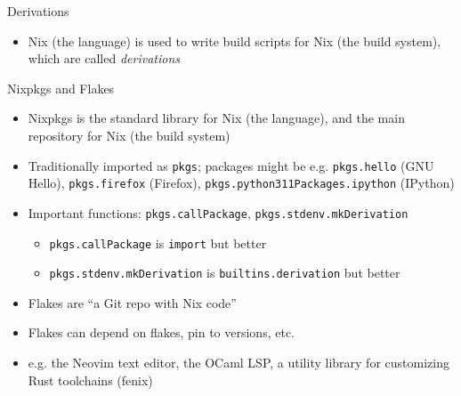 \documentclass[aspectratio=169, notes]{beamer}
\begin{document}
\begin{frame}{Derivations}
	\begin{itemize}
		\item Nix (the language) is used to write build scripts for Nix (the build system), which are called \emph{derivations}
	\end{itemize}
	
\end{frame}

\begin{frame}{Nixpkgs and Flakes}
	\begin{itemize}
		\item Nixpkgs is the standard library for Nix (the language), and the main repository for Nix (the build system)
		\item Traditionally imported as \texttt{pkgs}; packages might be e.g. \texttt{pkgs.hello} (GNU Hello), \texttt{pkgs.firefox} (Firefox), \texttt{pkgs.python311Packages.ipython} (IPython)
		\item Important functions: \texttt{pkgs.callPackage}, \texttt{pkgs.stdenv.mkDerivation}
		      \begin{itemize}
			      \item \texttt{pkgs.callPackage} is \texttt{import} but better
			      \item \texttt{pkgs.stdenv.mkDerivation} is \texttt{builtins.derivation} but better
		      \end{itemize}
		      \vspace{1cm}
		\item Flakes are ``a Git repo with Nix code''
		\item Flakes can depend on flakes, pin to versions, etc.
		\item e.g. the Neovim text editor, the OCaml LSP, a utility library for customizing Rust toolchains (fenix)
	\end{itemize}
\end{frame}
\end{document}
